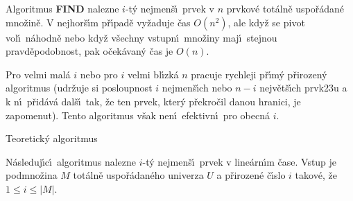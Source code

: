 Algoritmus {\bf FIND} nalezne $i$-t\'y nejmen\v s\'\i\ 
prvek v $n$ prv\-kov\'e tot\'aln\v e uspo\v r\'adan\'e mno\v zin\v e. V nejhor\v s\'\i m p\v r\'\i pad\v e 
vy\v za\-du\-je \v cas $O\left(n^2\right)$, ale kdy\v z se pivot vol\'\i\ 
n\'ahodn\v e nebo kdy\v z v\v sech\-ny vstupn\'\i\ mno\v ziny maj\'\i\ stejnou 
pravd\v epodobnost, pak o\v cek\'a\-va\-n\'y \v cas je $O\left(n\right)$.
\endproclaim


\flushpar Pro velmi mal\'a $i$ nebo pro $i$ velmi bl\'\i zk\'a $n$ 
pracuje rychleji p\v r\'\i m\'y p\v rirozen\'y algoritmus (udr\v zuje si 
posloupnost $i$ nejmen\-\v s\'\i ch nebo $n-i$ nejv\v et\v s\'\i ch 
prvk\accent23u a k n\'\i\ p\v rid\'av\'a dal\v s\'\i\ tak, \v ze ten 
prvek, kter\'y p\v re\-kro\v cil danou hranici, je zapomenut). Tento algoritmus v\v sak nen\'\i\ efektivn\'\i\ pro obecn\'a $i$. 
\medskip

\subhead
Teoretick\'y algoritmus
\endsubhead
\smallskip

\flushpar N\'asleduj\'\i c\'\i\ algoritmus nalezne $i$-t\'y nejmen\v s\'\i\ 
prvek v line\'arn\'\i m \v case.  Vstup je podmno\v zina $M$ tot\'aln\v e 
uspo\v r\'adan\'eho univerza $U$ a p\v rirozen\'e \v c\'\i slo $i$ takov\'e, \v ze 
$1\le i\le |M|$.  
\medskip

